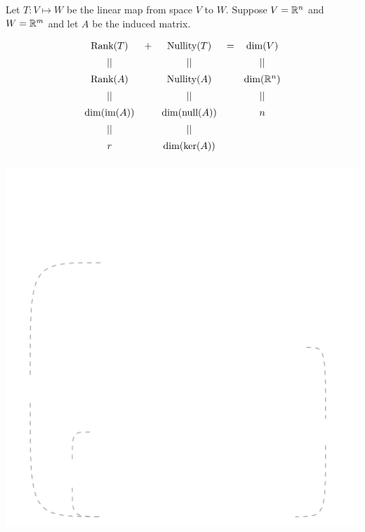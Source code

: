 \documentclass[pdf,9pt]{beamer}
\begin{document}
\begin{frame}[fragile]
    \begin{emptytitle}
       Let $T: V\mapsto W$ be the linear map from space $V$ to $W$.
       Suppose $V=\mathbb{R}^n$ and $W=\mathbb{R}^m$ and let $A$ be the induced matrix.
    \end{emptytitle}
    \vfill
   \begin{emptytitle}
    \begin{align*}
        \begin{array}{ccccc}
          \text{Rank}(T) & + & \text{Nullity}(T)   & = & \dim(V)    \\ [0.5em]
          |  |           &   & |  |                &   & |  |       \\ [0.5em]
          \text{Rank}(A) &   & \text{Nullity}(A)   &   & \dim(\mathbb{R}^n) \\ [0.5em]
          |  |           &   & |  |                &   & |  |       \\ [0.5em]
          \dim(\mbox{im}(A))   &   & \dim(\mbox{null}(A))       &   & n          \\ [0.5em]
                ||       &   & |  |                &   &            \\ [0.5em]
                 r       &   & \dim(\text{ker}(A)) &   &            \\ [0.5em]
        \end{array}
    \end{align*}
   \end{emptytitle}
\end{frame}
\begin{frame}[fragile]
   \begin{center}
       \includegraphics[scale=0.08]{./figures/Rank-nullity.png}
   \end{center}
\end{frame}
\end{document}
